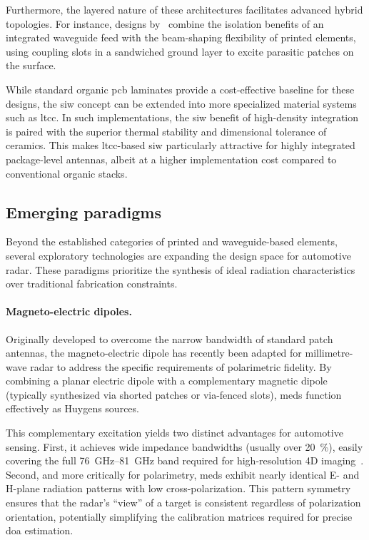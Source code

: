 Furthermore, the layered nature of these architectures facilitates advanced hybrid topologies.
For instance, designs by~\textcite{puskely5GSIWBasedPhased2022,yangMillimeterWaveDualPolarizedDifferentially2020} combine the isolation benefits of an integrated waveguide feed with the beam-shaping flexibility of printed elements, using coupling slots in a sandwiched ground layer to excite parasitic patches on the surface.

While standard organic \gls{pcb} laminates provide a cost-effective baseline for these designs, the \gls{siw} concept can be extended into more specialized material systems such as \gls{ltcc}.
In such implementations, the \gls{siw} benefit of high-density integration is paired with the superior thermal stability and dimensional tolerance of ceramics.
This makes \gls{ltcc}-based \gls{siw} particularly attractive for highly integrated package-level antennas, albeit at a higher implementation cost compared to conventional organic stacks.


\subsection{Emerging paradigms}
\label{sec:emerging_paradigms}

Beyond the established categories of printed and waveguide-based elements, several exploratory technologies are expanding the design space for automotive radar.
These paradigms prioritize the synthesis of ideal radiation characteristics over traditional fabrication constraints.

\paragraph{Magneto-electric dipoles.}
Originally developed to overcome the narrow bandwidth of standard patch antennas, the magneto-electric dipole has recently been adapted for millimetre-wave radar to address the specific requirements of polarimetric fidelity.
By combining a planar electric dipole with a complementary magnetic dipole (typically synthesized via shorted patches or via-fenced slots), \glspl{med} function effectively as Huygens sources.

This complementary excitation yields two distinct advantages for automotive sensing.
First, it achieves wide impedance bandwidths (usually over \qty{20}{\percent}), easily covering the full \qtyrange{76}{81}{GHz} band required for high-resolution 4D imaging~\parencite{li60GHzDualPolarizedTwoDimensional2016}.
Second, and more critically for polarimetry, \glspl{med} exhibit nearly identical E- and H-plane radiation patterns with low cross-polarization.
This pattern symmetry ensures that the radar's \enquote{view} of a target is consistent regardless of polarization orientation, potentially simplifying the calibration matrices required for precise \gls{doa} estimation.

